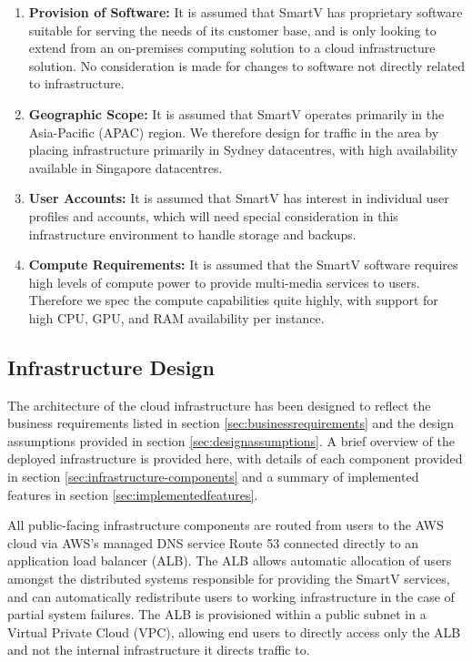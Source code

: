 \begin{enumerate}
    \item \textbf{Provision of Software:} It is assumed that SmartV has proprietary software suitable for serving the needs of its customer base, and is only looking to extend from an on-premises computing solution to a cloud infrastructure solution. No consideration is made for changes to software not directly related to infrastructure.
    \item \textbf{Geographic Scope:} It is assumed that SmartV operates primarily in the Asia-Pacific (APAC) region. We therefore design for traffic in the area by placing infrastructure primarily in Sydney datacentres, with high availability available in Singapore datacentres.
    \item \textbf{User Accounts:} It is assumed that SmartV has interest in individual user profiles and accounts, which will need special consideration in this infrastructure environment to handle storage and backups.
    \item \textbf{Compute Requirements:} It is assumed that the SmartV software requires high levels of compute power to provide multi-media services to users. Therefore we spec the compute capabilities quite highly, with support for high CPU, GPU, and RAM availability per instance.
\end{enumerate}

\subsection{Infrastructure Design}

The architecture of the cloud infrastructure has been designed to reflect the business requirements listed in section \ref{sec:businessrequirements} and the design assumptions provided in section \ref{sec:designassumptions}. A brief overview of the deployed infrastructure is provided here, with details of each component provided in section \ref{sec:infrastructure-components} and a summary of implemented features in section \ref{sec:implementedfeatures}.

All public-facing infrastructure components are routed from users to the AWS cloud via AWS's managed DNS service Route 53 connected directly to an application load balancer (ALB). The ALB allows automatic allocation of users amongst the distributed systems responsible for providing the SmartV services, and can automatically redistribute users to working infrastructure in the case of partial system failures. The ALB is provisioned within a public subnet in a Virtual Private Cloud (VPC), allowing end users to directly access only the ALB and not the internal infrastructure it directs traffic to.

